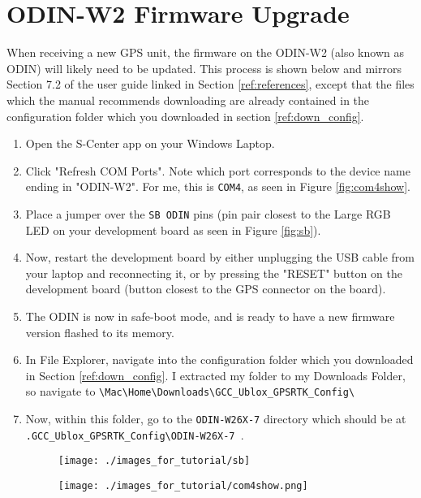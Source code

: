 \documentclass{article}%
\begin{document}
\appendix

\section{ODIN-W2 Firmware Upgrade}\label{ref:odin_firmware}
	When receiving a new GPS unit, the firmware on the ODIN-W2 (also known as ODIN) will likely need to be updated.  This process is shown below and mirrors Section 7.2 of the user guide linked in Section \ref{ref:references}, except that the files which the manual recommends downloading are already contained in the configuration folder which you downloaded in section \ref{ref:down_config}.
	
	\begin{enumerate}
	\item Open the S-Center app on your Windows Laptop.
	\item Click "Refresh COM Ports".  Note which port corresponds to the device name ending in "ODIN-W2".  For me, this is \texttt{COM4}, as seen in Figure \ref{fig:com4show}.
	\item Place a jumper over the \texttt{SB ODIN} pins (pin pair closest to the Large RGB LED on your development board as seen in Figure \ref{fig:sb}).
	\item Now, restart the development board by either unplugging the USB cable from your laptop and reconnecting it, or by pressing the "RESET" button on the development board (button closest to the GPS connector on the board).
	\item The ODIN is now in safe-boot mode, and is ready to have a new firmware version flashed to its memory.
	\item In File Explorer, navigate into the configuration folder which you downloaded in Section \ref{ref:down_config}.  I extracted my folder to my Downloads Folder, so navigate to \texttt{\textbackslash Mac\textbackslash Home\textbackslash Downloads\textbackslash GCC\_Ublox\_GPSRTK\_Config\textbackslash }
	\item Now, within this folder, go to the \texttt{ODIN-W26X-7} directory which should be at\\ \texttt{.GCC\_Ublox\_GPSRTK\_Config\textbackslash ODIN-W26X-7\ }.
	
	
	\begin{figure}
	\centering
	\begin{minipage}{.5\textwidth}
	  \centering
	  \texttt{[image: ./images\_for\_tutorial/sb]}
	  \label{fig:sb}
	\end{minipage}%
	\begin{minipage}{.5\textwidth}
	  \centering
	  \texttt{[image: ./images\_for\_tutorial/com4show.png]}
	  \label{fig:wxfolder}
	\end{minipage}
	\end{figure}
	

\end{enumerate}
\end{document}
